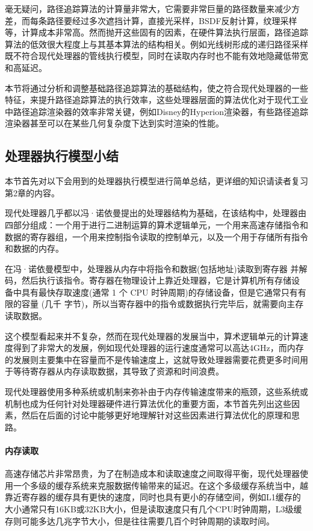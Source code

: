 毫无疑问，路径追踪算法的计算量非常大，它需要非常巨量的路径数量来减少方差，而每条路径要经过多次遮挡计算，直接光采样，BSDF反射计算，纹理采样等，计算成本非常高。然而抛开这些固有的因素，在硬件算法执行层面，路径追踪算法的低效很大程度上与其基本算法的结构相关。例如光线树形成的递归路径采样既不符合现代处理器的管线执行模型，同时在读取内存时也不能有效地隐藏低带宽和高延迟。

本节将通过分析和调整基础路径追踪算法的基础结构，使之符合现代处理器的一些特征，来提升路径追踪算法的执行效率，这些处理器层面的算法优化对于现代工业中路径追踪渲染器的效率非常关键，例如Disney的Hyperion渲染器，有些路径追踪渲染器甚至可以在某些几何复杂度下达到实时渲染的性能。






\subsection{处理器执行模型小结}
本节首先对以下会用到的处理器执行模型进行简单总结，更详细的知识请读者复习第2章的内容。

现代处理器几乎都以冯·诺依曼提出的处理器结构为基础，在该结构中，处理器由四部分组成：一个用于进行二进制运算的算术逻辑单元，一个用来高速存储指令和数据的寄存器组，一个用来控制指令读取的控制单元，以及一个用于存储所有指令和数据的内存。

在冯·诺依曼模型中，处理器从内存中将指令和数据(包括地址)读取到寄存器 并解码，然后执行该指令。寄存器在物理设计上靠近处理器，它是计算机所有存储设 备中具有最快存取速度(通常 1 个 CPU 时钟周期)的存储设备，但是它通常只有有 限的容量 (几千 字节)，所以当寄存器中的指令或数据执行完毕后，就需要向主存读取数据。

这个模型看起来并不复杂，然而在现代处理器的发展当中，算术逻辑单元的计算速度得到了非常大的发展，例如现代处理器的运行速度通常可以高达4GHz，而内存的发展则主要集中在容量而不是传输速度上，这就导致处理器需要花费更多时间用于等待寄存器从内存读取数据，其导致了资源和时间浪费。

现代处理器使用多种系统或机制来弥补由于内存传输速度带来的瓶颈，这些系统或机制也成为任何针对处理器硬件进行算法优化的重要方面，本节首先列出这些因素，然后在后面的讨论中能够更好地理解针对这些因素进行算法优化的原理和思路。




\paragraph{内存读取}
高速存储芯片非常昂贵，为了在制造成本和读取速度之间取得平衡，现代处理器使用一个多级的缓存系统来克服数据传输带来的延迟。在这个多级缓存系统当中，越靠近寄存器的缓存具有更快的速度，同时也具有更小的存储空间，例如L1缓存的大小通常只有16KB或32KB大小，但是读取速度只有几个CPU时钟周期，L3级缓存则可能多达几兆字节大小，但是往往需要几百个时钟周期的读取时间。

